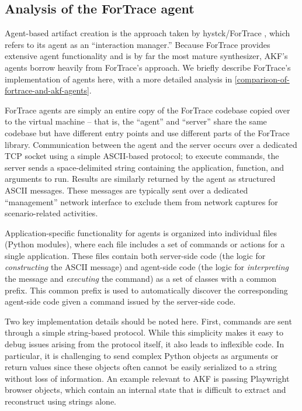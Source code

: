 \documentclass[letterpaper,12pt]{report}
\begin{document}
\subsection{Analysis of the ForTrace
agent}\label{analysis-of-the-fortrace-agent}

Agent-based artifact creation is the approach taken by hystck/ForTrace
\cite{gobelNovelApproachGenerating2020,gobelForTraceHolisticForensic2022},
which refers to its agent as an ``interaction manager.'' Because
ForTrace provides extensive agent functionality and is by far the most
mature synthesizer, AKF's agents borrow heavily from ForTrace's
approach. We briefly describe ForTrace's implementation of agents here,
with a more detailed analysis in \autoref{comparison-of-fortrace-and-akf-agents}.

ForTrace agents are simply an entire copy of the ForTrace codebase
copied over to the virtual machine -- that is, the ``agent'' and
``server'' share the same codebase but have different entry points and
use different parts of the ForTrace library. Communication between the
agent and the server occurs over a dedicated TCP socket using a simple
ASCII-based protocol; to execute commands, the server sends a
space-delimited string containing the application, function, and
arguments to run. Results are similarly returned by the agent as
structured ASCII messages. These messages are typically sent over a
dedicated ``management'' network interface to exclude them from network
captures for scenario-related activities.

Application-specific functionality for agents is organized into
individual files (Python modules), where each file includes a set of
commands or actions for a single application. These files contain both
server-side code (the logic for \emph{constructing} the ASCII message)
and agent-side code (the logic for \emph{interpreting} the message and
\emph{executing} the command) as a set of classes with a common prefix.
This common prefix is used to automatically discover the corresponding
agent-side code given a command issued by the server-side code.

Two key implementation details should be noted here. First, commands are
sent through a simple string-based protocol. While this simplicity makes
it easy to debug issues arising from the protocol itself, it also leads
to inflexible code. In particular, it is challenging to send complex
Python objects as arguments or return values since these objects often
cannot be easily serialized to a string without loss of information. An
example relevant to AKF is passing Playwright browser objects, which
contain an internal state that is difficult to extract and reconstruct
using strings alone.
\end{document}
